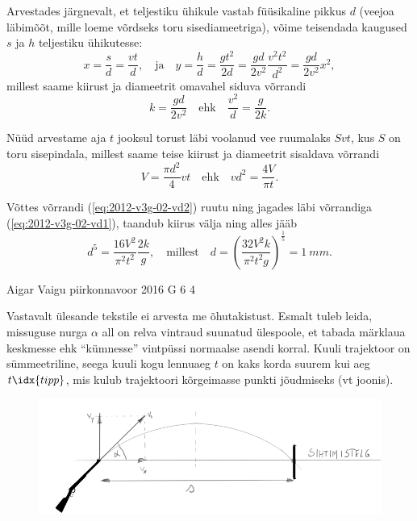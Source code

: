 \documentclass[11pt]{article}
\begin{document}
{{Arvestades järgnevalt, et teljestiku ühikule vastab füüsikaline pikkus $d$ (veejoa läbimõõt, mille loeme võrdseks toru sisediameetriga), võime teisendada kaugused $s$ ja $h$ teljestiku ühikutesse:
\[x=\frac{s}{d}=\frac{vt}{d},\quad \mathrm{ja} \quad y=\frac{h}{d}=\frac{gt^2}{2d}=\frac{gd}{2v^2}\frac{v^2t^2}{d^2}=\frac{gd}{2v^2}x^2,\]
millest saame kiirust ja diameetrit omavahel siduva võrrandi
\begin{equation}\label{eq:2012-v3g-02-vd1}
k=\frac{gd}{2v^2}\quad \mathrm{ehk} \quad \frac{v^2}{d}=\frac{g}{2k}.
\end{equation}
	
Nüüd arvestame aja $t$ jooksul torust läbi voolanud vee ruumalaks $Svt$, kus $S$ on toru sisepindala, millest saame teise kiirust ja diameetrit sisaldava võrrandi
\begin{equation}\label{eq:2012-v3g-02-vd2}
V=\frac{\pi d^2}{4}vt \quad \mathrm{ehk} \quad vd^2=\frac{4V}{\pi t}.
\end{equation}

Võttes võrrandi (\ref{eq:2012-v3g-02-vd2}) ruutu ning jagades läbi võrrandiga (\ref{eq:2012-v3g-02-vd1}), taandub kiirus välja ning alles jääb
\[d^5=\frac{16V^2}{\pi^2t^2}\frac{2k}{g}, \quad \mathrm{millest} \quad d=\left(\frac{32V^2k}{\pi^2 t^2 g}\right)^{\frac{1}{5}}=\SI{1}{mm	}.\]
\fi
}

{Aigar Vaigu} %
{piirkonnavoor} %
{2016} %
{G 6} %
{4} %
{

\ifSolution
Vastavalt ülesande tekstile ei arvesta me õhutakistust.
Esmalt tuleb leida, missuguse nurga $\alpha$ all on relva vintraud suunatud ülespoole, et tabada märklaua keskmesse ehk \enquote{kümnesse} vintpüssi normaalse asendi korral. Kuuli trajektoor on sümmeetriline, seega kuuli kogu lennuaeg $t$ on kaks korda suurem kui aeg $t\idx{tipp}$, mis kulub trajektoori kõrgeimasse punkti jõudmiseks (vt joonis).
\begin{figure}[h!]
	\centering
	\includegraphics[scale=0.55]{2016-v2g-06-Lasketiir-1.PNG}
\end{figure}

}}
\end{document}
